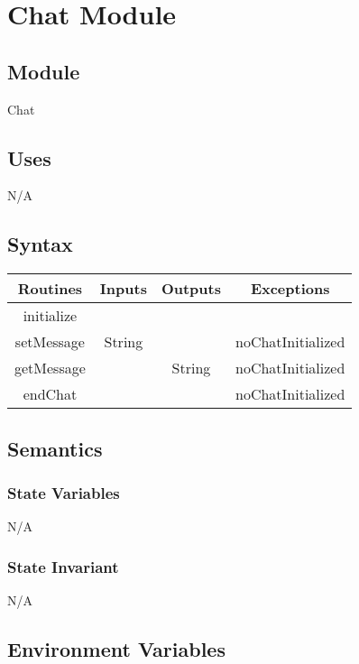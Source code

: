 \documentclass{article}
\begin{document}
\newpage
\section*{Chat Module}
    \subsection*{Module}
        Chat
    
    \subsection*{Uses}
        N/A
    
    \subsection*{Syntax}
        
        \begin{center}
            \begin{tabular}{|c|c|c|c|} 
                \hline
                Routines & Inputs & Outputs & Exceptions \\
                \hline
                initialize & & &\\
                \hline
                setMessage & String &  & noChatInitialized\\ 
                \hline
                getMessage &  & String & noChatInitialized\\
                \hline
                endChat & & & noChatInitialized\\
                \hline
            \end{tabular}
        \end{center}
    
    \subsection*{Semantics}
        \subsubsection*{State Variables}
            N/A
            
        \subsubsection*{State Invariant}
            N/A
            
    \subsection*{Environment Variables}
            
\end{document}
